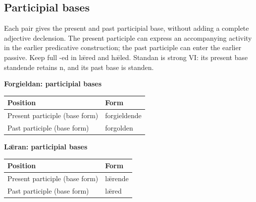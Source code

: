 \subsection*{Participial bases}

Each pair gives the present and past participial base, without adding a complete adjective declension. The present participle can express an accompanying activity in the earlier predicative construction; the past participle can enter the earlier passive. Keep full -ed in lǣred and hǣled. Standan is strong VI: its present base standende retains n, and its past base is standen.

\textbf{Forgieldan: participial bases}

\par\begingroup
\fontsize{10.5}{13.2}\selectfont
\setlength{\LTleft}{0pt}\setlength{\LTright}{\fill}
\noindent
\begin{tabular}{@{}>{\raggedright\arraybackslash}p{74.28mm}>{\raggedright\arraybackslash}p{46.91mm}@{}}
\toprule
\textbf{Position} & \textbf{Form} \\
\midrule
Present participle (base form) & forgieldende \\
Past participle (base form) & forgolden \\
\bottomrule
\end{tabular}
\par\endgroup

\textbf{Lǣran: participial bases}

\par\begingroup
\fontsize{10.5}{13.2}\selectfont
\setlength{\LTleft}{0pt}\setlength{\LTright}{\fill}
\noindent
\begin{tabular}{@{}>{\raggedright\arraybackslash}p{79.4mm}>{\raggedright\arraybackslash}p{41.79mm}@{}}
\toprule
\textbf{Position} & \textbf{Form} \\
\midrule
Present participle (base form) & lǣrende \\
Past participle (base form) & lǣred \\
\bottomrule
\end{tabular}
\par\endgroup

